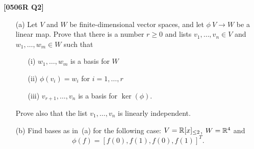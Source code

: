 \documentclass[a4paper]{article}
\begin{document}
\begin{problem}\textbf{[0506R Q2]}
 \begin{itemize}
  \item[(a)]
   Let $V$ and $W$ be finite-dimensional vector spaces, and
   let $\phi\:V\to W$ be a linear map.  Prove that there is
   a number $r\geq 0$ and lists $v_1,\dotsc,v_n\in V$ and
   $w_1,\dotsc,w_m\in W$ such that
   \begin{itemize}
    \item[(i)] $w_1,\dotsc,w_m$ is a basis for $W$
    \item[(ii)] $\phi(v_i)=w_i$ for $i=1,\dotsc,r$
    \item[(iii)] $v_{r+1},\dotsc,v_n$ is a basis for
     $\ker(\phi)$. 
   \end{itemize}
   Prove also that the list $v_1,\dotsc,v_n$ is linearly
   independent.  
  \item[(b)]
   Find bases as in~(a) for the following case:
   $V={\mathbb{R}}[x]_{\leq 2}$, $W={\mathbb{R}}^4$ and 
   \[ \phi(f) = [f(0),f(1),f(0),f(1)]^T.  \]
 \end{itemize}
\end{problem}
\end{document}
